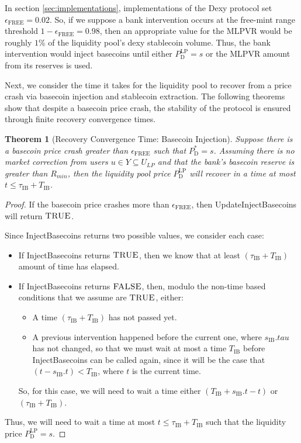 \documentclass{ifcolog}
\newcommand{\Pdt}{P_{\mathrm{D}}^{*}}
\newcommand{\Plp}{P_{\mathrm{D}}^{\mathrm{LP}}}
\newcommand{\sib}{s_{\textrm{IB}}}
\newcommand{\ulp}{U_{LP}}
\newcommand{\epsilonfree}{\epsilon_{\textrm{FREE}}}
\newtheorem{theorem}{Theorem}
\begin{document}
In section \ref{sec:implementations}, implementations of the Dexy protocol set $\epsilonfree = 0.02$.
So, if we suppose a bank intervention occurs at the free-mint range threshold $1 - \epsilonfree = 0.98$, 
then an appropriate value for the $\textrm{MLPVR}$ would be roughly $1 \%$ of the liquidity pool's dexy stablecoin volume.
Thus, the bank intervention would inject basecoins until either $\Plp = s$ or the \textrm{MLPVR} amount from its reserves is used.

Next, we consider the time it takes for the liquidity pool to recover from a price crash via basecoin injection and 
stablecoin extraction. The following theorems show that despite a basecoin price crash, the stability of the protocol is 
ensured through finite recovery convergence times.

\begin{theorem}[Recovery Convergence Time: Basecoin Injection]
  Suppose there is a basecoin price crash greater than $\epsilonfree$ such that $\Pdt = s$. Assuming there is no 
  market correction from users $u \in Y \subseteq \ulp$ and that the bank's basecoin reserve is greater than $R_{min}$, 
  then the liquidity pool price $\Plp$ will recover in a time at most $t \le \tau_{\textrm{IB}} + T_{\textrm{IB}}$.
\end{theorem}

\begin{proof}
  If the basecoin price crashes more than $\epsilonfree$, then UpdateInjectBasecoins will return
  $\textsc{TRUE}$.
  
  Since InjectBasecoins returns two possible values, we consider each case:
  \begin{itemize}
    \item If InjectBasecoins returns $\textsc{TRUE}$, then we know that at least
          $(\tau_{\textrm{IB}} + T_{\textrm{IB}})$ amount of time has elapsed.
    \item If InjectBasecoins returns $\textsc{FALSE}$, then, 
          modulo the non-time based conditions that we assume are $\textsc{TRUE}$, either:
          \begin{itemize}
            \item A time $(\tau_{\textrm{IB}} + T_{\textrm{IB}})$ has not passed yet.
            \item A previous intervention happened before the current one, where $\sib.tau$ has not changed,
                  so that we must wait at most a time $T_{\textrm{IB}}$ before InjectBasecoins can be called again,
                  since it will be the case that $(t - \sib.t) < T_{\textrm{IB}}$, where $t$ is the current time.
          \end{itemize}
          So, for this case, we will need to wait a time either $\left(T_{\textrm{IB}} + \sib.t - t\right)$ or $\left(\tau_{\textrm{IB}} + T_{\textrm{IB}}\right)$.
  \end{itemize}
  Thus, we will need to wait a time at most $t \le \tau_{\textrm{IB}} + T_{\textrm{IB}}$
  such that the liquidity price $\Plp = s$.
\end{proof}
\end{document}

